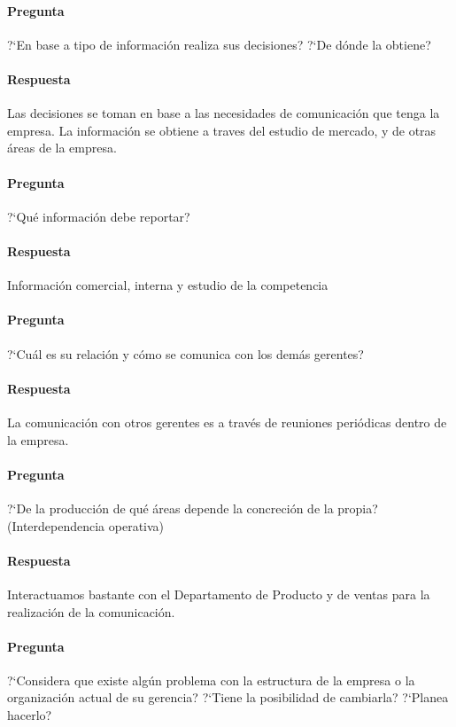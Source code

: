 \documentclass[12pt,a4paper,spanish]{article}
\begin{document}
	\paragraph{Pregunta}
	 ?`En base a tipo de informaci\'on realiza sus decisiones?  ?`De d\'onde la obtiene?
	\paragraph{Respuesta}
	Las decisiones se toman en base a las necesidades de comunicaci\'on que tenga la empresa. La informaci\'on se obtiene a traves del estudio de mercado, y de otras \'areas de la empresa.
	
	\paragraph{Pregunta}
	 ?`Qu\'e informaci\'on debe reportar?
	\paragraph{Respuesta}
	Informaci\'on comercial, interna y estudio de la competencia


	\paragraph{Pregunta}
	 ?`Cu\'al es su relaci\'on y c\'omo se comunica con los dem\'as gerentes?
	\paragraph{Respuesta}
	La comunicaci\'on con otros gerentes es a trav\'es de reuniones peri\'odicas dentro de la empresa.

	\paragraph{Pregunta}
	 ?`De la producci\'on de qu\'e \'areas depende la concreci\'on de la propia? (Interdependencia operativa)
	\paragraph{Respuesta}
	Interactuamos bastante con el Departamento de Producto y de ventas para la realizaci\'on de la comunicaci\'on.

	\paragraph{Pregunta}
	 ?`Considera que existe alg\'un problema con la estructura de la empresa o la organizaci\'on actual de su gerencia?  ?`Tiene la posibilidad de cambiarla?  ?`Planea hacerlo?
\end{document}
